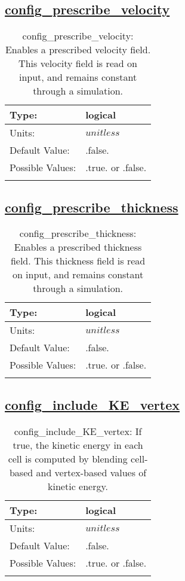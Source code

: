 \subsection[config\_prescribe\_velocity]{\hyperref[sec:nm_tab_debug]{config\_prescribe\_velocity}}
\label{subsec:nm_sec_config_prescribe_velocity}
\begin{center}
\begin{longtable}{| p{2.0in} || p{4.0in} |}
    \hline
    Type: & logical \\
    \hline
    Units: & $unitless$ \\
    \hline
    Default Value: & .false. \\
    \hline
    Possible Values: & .true. or .false. \\
    \hline
    \caption{config\_prescribe\_velocity: Enables a prescribed velocity field. This velocity field is read on input, and remains constant through a simulation.}
\end{longtable}
\end{center}
\subsection[config\_prescribe\_thickness]{\hyperref[sec:nm_tab_debug]{config\_prescribe\_thickness}}
\label{subsec:nm_sec_config_prescribe_thickness}
\begin{center}
\begin{longtable}{| p{2.0in} || p{4.0in} |}
    \hline
    Type: & logical \\
    \hline
    Units: & $unitless$ \\
    \hline
    Default Value: & .false. \\
    \hline
    Possible Values: & .true. or .false. \\
    \hline
    \caption{config\_prescribe\_thickness: Enables a prescribed thickness field. This thickness field is read on input, and remains constant through a simulation.}
\end{longtable}
\end{center}
\subsection[config\_include\_KE\_vertex]{\hyperref[sec:nm_tab_debug]{config\_include\_KE\_vertex}}
\label{subsec:nm_sec_config_include_KE_vertex}
\begin{center}
\begin{longtable}{| p{2.0in} || p{4.0in} |}
    \hline
    Type: & logical \\
    \hline
    Units: & $unitless$ \\
    \hline
    Default Value: & .false. \\
    \hline
    Possible Values: & .true. or .false. \\
    \hline
    \caption{config\_include\_KE\_vertex: If true, the kinetic energy in each cell is computed by blending cell-based and vertex-based values of kinetic energy.}
\end{longtable}
\end{center}
